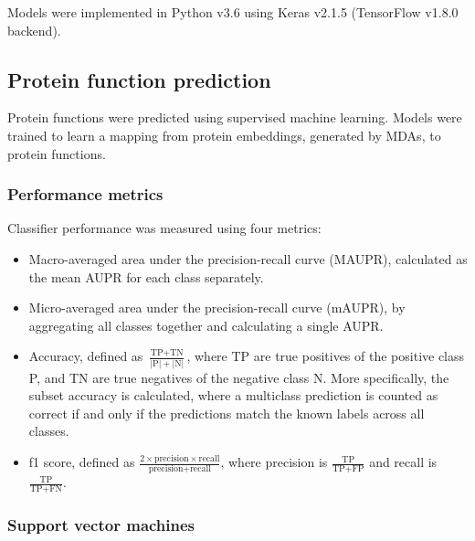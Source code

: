 \noindent Models were implemented in Python v3.6 \cite{Python} using Keras v2.1.5 \cite{chollet2015keras}
(TensorFlow v1.8.0 \cite{GoogleResearch2015} backend).

\subsection{Protein function prediction}

Protein functions were predicted using supervised machine learning.
Models were trained to learn a mapping from protein embeddings, generated by MDAs, to protein functions.

\subsubsection{Performance metrics}
\label{performance}

Classifier performance was measured using four metrics:

\begin{itemize}
    \item Macro-averaged area under the precision-recall curve (MAUPR), calculated as the mean AUPR for each class separately.
    \item Micro-averaged area under the precision-recall curve (mAUPR), by aggregating all classes together and calculating a single AUPR.
    \item Accuracy, defined as $\frac{\text{TP} + \text{TN}}{|\text{P}| + |\text{N}|}$, where TP are true positives of the positive class P, and TN are true negatives of the negative class N. More specifically, the subset accuracy is calculated, where a multiclass prediction is counted as correct if and only if the predictions match the known labels across all classes.
    \item f1 score, defined as $\frac{2 \times \text{precision} \times \text{recall}}{\text{precision} + \text{recall}}$, where precision is $\frac{\text{TP}}{\text{TP} + \text{FP}}$ and recall is $\frac{\text{TP}}{\text{TP} + \text{FN}}$.
\end{itemize}

\subsubsection{Support vector machines}
\label{support-vector-machine}

